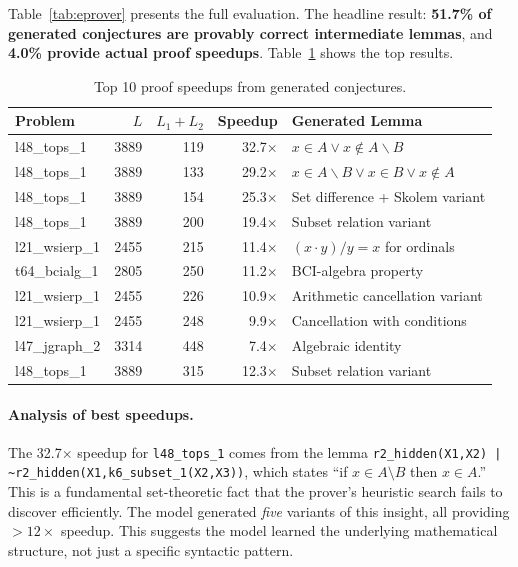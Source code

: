 \documentclass{article}
\begin{document}
Table~\ref{tab:eprover} presents the full evaluation. The headline result:
\textbf{51.7\% of generated conjectures are provably correct intermediate lemmas},
and \textbf{4.0\% provide actual proof speedups}. Table~\ref{tab:best_speedups}
shows the top results.

\begin{table}[t]
\centering
\caption{Top 10 proof speedups from generated conjectures.}
\label{tab:best_speedups}
\small
\begin{tabular}{lrrrl}
\toprule
\textbf{Problem} & \textbf{$L$} & \textbf{$L_1{+}L_2$} & \textbf{Speedup} & \textbf{Generated Lemma} \\
\midrule
l48\_tops\_1 & 3889 & 119 & 32.7$\times$ & $x{\in}A \lor x{\notin}A\backslash B$ \\
l48\_tops\_1 & 3889 & 133 & 29.2$\times$ & $x{\in}A\backslash B \lor x{\in}B \lor x{\notin}A$ \\
l48\_tops\_1 & 3889 & 154 & 25.3$\times$ & Set difference + Skolem variant \\
l48\_tops\_1 & 3889 & 200 & 19.4$\times$ & Subset relation variant \\
l21\_wsierp\_1 & 2455 & 215 & 11.4$\times$ & $(x{\cdot}y)/y = x$ for ordinals \\
t64\_bcialg\_1 & 2805 & 250 & 11.2$\times$ & BCI-algebra property \\
l21\_wsierp\_1 & 2455 & 226 & 10.9$\times$ & Arithmetic cancellation variant \\
l21\_wsierp\_1 & 2455 & 248 & 9.9$\times$ & Cancellation with conditions \\
l47\_jgraph\_2 & 3314 & 448 & 7.4$\times$ & Algebraic identity \\
l48\_tops\_1 & 3889 & 315 & 12.3$\times$ & Subset relation variant \\
\bottomrule
\end{tabular}
\end{table}

\paragraph{Analysis of best speedups.}
The 32.7$\times$ speedup for \texttt{l48\_tops\_1} comes from the lemma
\texttt{r2\_hidden(X1,X2) | \~{}r2\_hidden(X1,k6\_subset\_1(X2,X3))}, which
states ``if $x \in A \setminus B$ then $x \in A$.'' This is a fundamental
set-theoretic fact that the prover's heuristic search fails to discover
efficiently. The model generated \emph{five} variants of this insight, all
providing $>12\times$ speedup. This suggests the model learned the underlying
mathematical structure, not just a specific syntactic pattern.
\end{document}

